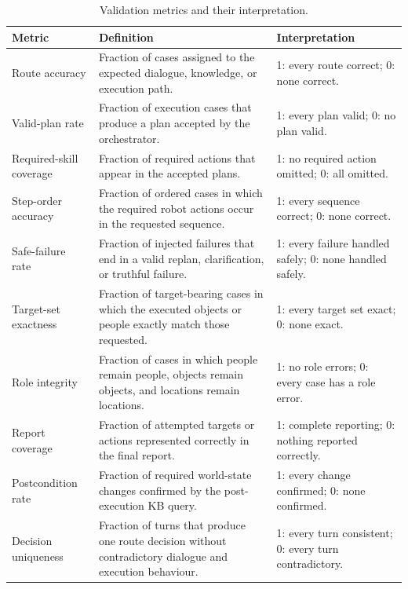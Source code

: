 \begin{table}[H]
\centering
\small
\renewcommand{\arraystretch}{1.16}
\caption{Validation metrics and their interpretation.}
\label{tab:validation-metrics}
\begin{tabularx}{\textwidth}{@{}p{}X p{}@{}}
\toprule
\textbf{Metric} & \textbf{Definition} & \textbf{Interpretation}\\
\midrule
Route accuracy & Fraction of cases assigned to the expected dialogue, knowledge, or execution path. & 1: every route correct; 0: none correct.\\
Valid-plan rate & Fraction of execution cases that produce a plan accepted by the orchestrator. & 1: every plan valid; 0: no plan valid.\\
Required-skill coverage & Fraction of required actions that appear in the accepted plans. & 1: no required action omitted; 0: all omitted.\\
Step-order accuracy & Fraction of ordered cases in which the required robot actions occur in the requested sequence. & 1: every sequence correct; 0: none correct.\\
Safe-failure rate & Fraction of injected failures that end in a valid replan, clarification, or truthful failure. & 1: every failure handled safely; 0: none handled safely.\\
Target-set exactness & Fraction of target-bearing cases in which the executed objects or people exactly match those requested. & 1: every target set exact; 0: none exact.\\
Role integrity & Fraction of cases in which people remain people, objects remain objects, and locations remain locations. & 1: no role errors; 0: every case has a role error.\\
Report coverage & Fraction of attempted targets or actions represented correctly in the final report. & 1: complete reporting; 0: nothing reported correctly.\\
Postcondition rate & Fraction of required world-state changes confirmed by the post-execution KB query. & 1: every change confirmed; 0: none confirmed.\\
Decision uniqueness & Fraction of turns that produce one route decision without contradictory dialogue and execution behaviour. & 1: every turn consistent; 0: every turn contradictory.\\
\bottomrule
\end{tabularx}
\end{table}

